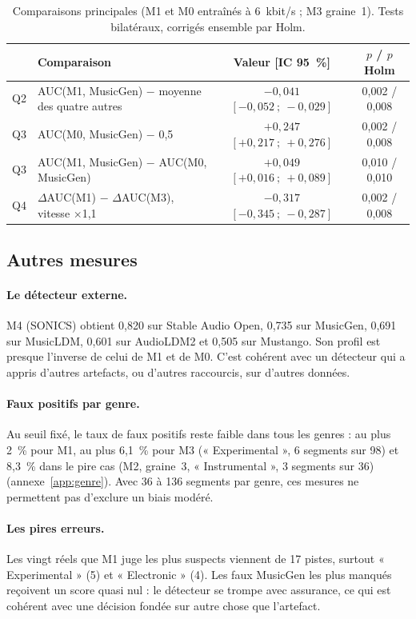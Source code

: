 \documentclass[a4paper, 11pt]{article}
\newcommand{\dAUC}{$\Delta$AUC}
\begin{document}
\begin{table}[h]
    \centering
    \small
    \begin{tabularx}{\textwidth}{lYcc}
        \toprule
        & Comparaison & Valeur [IC 95~\%] & $p$ / $p$ Holm \\
        \midrule
        Q2 & AUC(M1, MusicGen) $-$ moyenne des quatre autres & $-0{,}041$ $[-0{,}052~;~-0{,}029]$ & 0,002 / 0,008 \\
        Q3 & AUC(M0, MusicGen) $-$ 0,5 & $+0{,}247$ $[+0{,}217~;~+0{,}276]$ & 0,002 / 0,008 \\
        Q3 & AUC(M1, MusicGen) $-$ AUC(M0, MusicGen) & $+0{,}049$ $[+0{,}016~;~+0{,}089]$ & 0,010 / 0,010 \\
        Q4 & \dAUC(M1) $-$ \dAUC(M3), vitesse $\times$1,1 & $-0{,}317$ $[-0{,}345~;~-0{,}287]$ & 0,002 / 0,008 \\
        \bottomrule
    \end{tabularx}
    \caption{Comparaisons principales (M1 et M0 entraînés à 6~kbit/s ; M3 graine~1). Tests bilatéraux,
    corrigés ensemble par Holm.}
    \label{tab:synthese}
\end{table}

\subsection{Autres mesures}

\paragraph{Le détecteur externe.} M4 (SONICS) obtient 0,820 sur Stable Audio Open, 0,735 sur MusicGen, 0,691
sur MusicLDM, 0,601 sur AudioLDM2 et 0,505 sur Mustango. Son profil est presque l'inverse de celui de M1 et de
M0. C'est cohérent avec un détecteur qui a appris d'autres artefacts, ou d'autres raccourcis, sur d'autres
données.

\paragraph{Faux positifs par genre.} Au seuil fixé, le taux de faux positifs reste faible dans tous les genres :
au plus 2~\% pour M1, au plus 6,1~\% pour M3 (« Experimental », 6 segments sur 98) et 8,3~\% dans le pire cas
(M2, graine~3, « Instrumental », 3 segments sur 36) (annexe~\ref{app:genre}). Avec 36 à 136 segments par genre,
ces mesures ne permettent pas d'exclure un biais modéré.

\paragraph{Les pires erreurs.} Les vingt réels que M1 juge les plus suspects viennent de 17 pistes, surtout
« Experimental » (5) et « Electronic » (4). Les faux MusicGen les plus manqués reçoivent un score quasi nul : le
détecteur se trompe avec assurance, ce qui est cohérent avec une décision fondée sur autre chose que
l'artefact.
\end{document}
